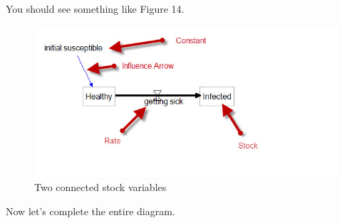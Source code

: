 \documentclass[11pt]{amsart}
\begin{document}
You should see something like Figure 14.



\begin{figure}[ht]
\begin{center}
\vspace{.2in}
\centerline {
\includegraphics[totalheight=0.15\textheight]{images/014.jpg}
}
\caption{Two connected stock variables}
\label{fig:014}
\end{center}
\end{figure}

Now let's complete the entire diagram.
\end{document}
